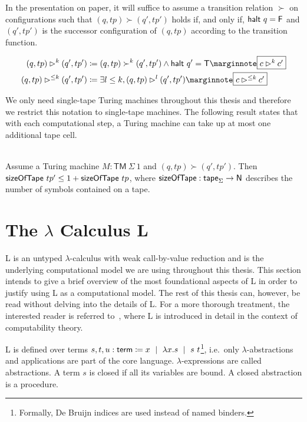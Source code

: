 In the presentation on paper, it will suffice to assume a transition relation $\succ$ on configurations such that 
$(q, tp) \succ (q', tp')$ holds if, and only if, $\textsf{halt}~q = \mathsf{F}$ and $(q', tp')$ is the successor configuration of $(q, tp)$ according to the transition function. 
\begin{definition}
  \begin{align*}
    (q, tp) \rhd^{k} (q', tp') &\defeq (q, tp) \succ^k (q', tp') \land \textsf{halt}~q' = \btrue \mnote{$c \rhd^k c'$}\\
    (q, tp) \rhd^{\le k} (q', tp') &\defeq \exists l \le k, (q, tp) \rhd^l (q', tp')\mnote{$c \rhd^{\le{} k} c'$}
  \end{align*}
\end{definition}

We only need single-tape Turing machines throughout this thesis and therefore we restrict this notation to single-tape machines.
The following result states that with each computational step, a Turing machine can take up at most one additional tape cell. 
\begin{lemma}\label{lem:time_bounds_space}~\\
  Assume a Turing machine $M : \textsf{TM}~\Sigma~1$ and $(q, tp) \succ (q', tp')$. Then $\textsf{sizeOfTape}~tp' \le 1 +{\textsf{sizeOfTape}~tp}$, 
  where $\textsf{sizeOfTape} : \textsf{tape}_\Sigma \rightarrow \mathsf{N}$ describes the number of symbols contained on a tape.
\end{lemma}

\newcommand{\Lterm}{\textsf{term}}
\section{The $\lambda$ Calculus L}
L is an untyped $\lambda$-calculus with weak call-by-value reduction and is the underlying computational model we are using throughout this thesis. 
This section intends to give a brief overview of the most foundational aspects of L in order to justify using L as a computational model. The rest of this thesis can, however, be read without delving into the details of L. 
For a more thorough treatment, the interested reader is referred to~\cite{ForsterSmolka:2017:L-Computability}, where L is introduced in detail in the context of computability theory.

L is defined over terms $s, t, u: \Lterm \defeq x \bnfmid \lambda x. s \bnfmid s~t$\footnote{Formally, De Bruijn indices are used instead of named binders.}, i.e.\ only $\lambda$-abstractions and applications are part of the core language. $\lambda$-expressions are called abstractions. A term $s$ is closed if all its variables are bound. A closed abstraction is a procedure.

